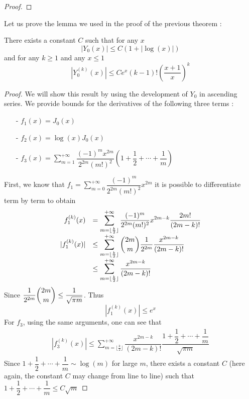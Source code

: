 \documentclass[11pt,a4paper]{article}
\begin{document}
\begin{The}
\begin{proof}
\end{proof}

\end{The}

Let us prove the lemma we used in the proof of the previous theorem :
\begin{Lem} There exists a constant $C$ such that for any $x $ 
\[\left|Y_0(x)\right| \leq C\left(1+\left|\log(x)\right|\right)\] and for any $k \geq 1$ and any $x \leq 1$  
\[ \left|Y_0^{(k)}(x)\right| \leq Ce^x(k-1)!\left(\dfrac{x+1}{x}\right)^k\] 
\label{LemDeriveesY0}
\begin{proof}
We will show this result by using the development of $Y_0$ in ascending series. We provide bounds for the derivatives of the following three terms : 
\begin{itemize}
\item[-] $f_1(x) = J_0(x)$ 
\item[-] $f_2(x) = \log\left(x\right) J_0(x)$
\item[-] $f_3(x) = \displaystyle\sum_{m=1}^{+\infty}\dfrac{(-1)^mx^{2m}}{2^{2m}(m!)^2}\left(1+ \dfrac{1}{2} + \cdots + \dfrac{1}{m}\right) $
\end{itemize} 
First, we know that $f_1 = \displaystyle\sum_{m = 0}^{+\infty}\dfrac{(-1)^m}{2^{2m}(m!)^2} x^{2m}$
it is possible to differentiate term by term to obtain 
\[  \begin{array}{rl}
f_1^{(k)}(x) &= \displaystyle\sum_{m = \lfloor \frac{k}{2}\rfloor}^{+\infty}\dfrac{(-1)^m}{2^{2m}(m!)^2} x^{2m-k}\dfrac{2m!}{(2m-k)!} \\
|f_1^{(k)}(x)| & \leq  \displaystyle\sum_{m = \lfloor \frac{k}{2}\rfloor}^{+\infty}\dbinom{2m}{m}\dfrac{1}{2^{2m}} \dfrac{x^{2m-k}}{(2m-k)!} \\
 & \leq  \displaystyle\sum_{m = \lfloor \frac{k}{2}\rfloor}^{+\infty}\dfrac{x^{2m-k}}{(2m-k)!}  
\end{array}
\]
Since $\dfrac{1}{2^{2m}} \dbinom{2m}{m} \leq \dfrac{1}{\sqrt{\pi m}}$.
Thus 
\[|f_1^{(k)}(x)| \leq e^{x}\]
For $f_3$, using the same arguments, one can see that 
\[  \begin{array}{rl}
|f_3^{(k)}(x)| \leq  \displaystyle\sum_{m = \lfloor \frac{k}{2}\rfloor}^{+\infty}\dfrac{x^{2m-k}}{(2m-k)!}\dfrac{1+ \dfrac{1}{2} + \cdots + \dfrac{1}{m}}{\sqrt{\pi m}}
\end{array}
\]
Since $1+ \dfrac{1}{2} + \cdots + \dfrac{1}{m} \sim \log(m)$ for large $m$, there exists a constant $C$ (here again, the constant $C$ may change from line to line) such that  $1+ \dfrac{1}{2} + \cdots + \dfrac{1}{m} \leq C \sqrt{m} $

\end{proof}
\end{Lem}
\end{document}
